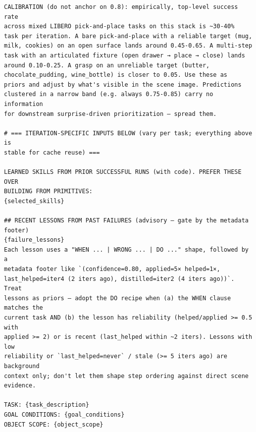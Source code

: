 \begin{lstlisting}[style=ratsappendixprompt]
CALIBRATION (do not anchor on 0.8): empirically, top-level success rate
across mixed LIBERO pick-and-place tasks on this stack is ~30-40%
task per iteration. A bare pick-and-place with a reliable target (mug,
milk, cookies) on an open surface lands around 0.45-0.65. A multi-step
task with an articulated fixture (open drawer → place → close) lands
around 0.10-0.25. A grasp on an unreliable target (butter,
chocolate_pudding, wine_bottle) is closer to 0.05. Use these as
priors and adjust by what's visible in the scene image. Predictions
clustered in a narrow band (e.g. always 0.75-0.85) carry no information
for downstream surprise-driven prioritization — spread them.

# === ITERATION-SPECIFIC INPUTS BELOW (vary per task; everything above is
stable for cache reuse) ===

LEARNED SKILLS FROM PRIOR SUCCESSFUL RUNS (with code). PREFER THESE OVER
BUILDING FROM PRIMITIVES:
{selected_skills}

## RECENT LESSONS FROM PAST FAILURES (advisory — gate by the metadata
footer)
{failure_lessons}
Each lesson uses a "WHEN ... | WRONG ... | DO ..." shape, followed by a
metadata footer like `(confidence=0.80, applied=5× helped=1×,
last_helped=iter4 (2 iters ago), distilled=iter2 (4 iters ago))`. Treat
lessons as priors — adopt the DO recipe when (a) the WHEN clause matches the
current task AND (b) the lesson has reliability (helped/applied >= 0.5 with
applied >= 2) or is recent (last_helped within ~2 iters). Lessons with low
reliability or `last_helped=never` / stale (>= 5 iters ago) are background
context only; don't let them shape step ordering against direct scene
evidence.

TASK: {task_description}
GOAL CONDITIONS: {goal_conditions}
OBJECT SCOPE: {object_scope}
\end{lstlisting}

